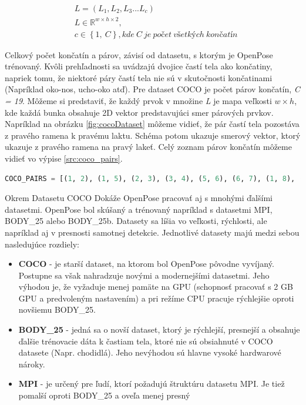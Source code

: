 \documentclass[slovak,master,dept460,male,cpp,cpdeclaration]{diploma}
\begin{document}
\begin{eqnarray}
& L = (L_{1}, L_{2}, L_{3} ... L_{c}) \label{eq:pafmap}\\
& L\in\mathbb{R}^{w \times  h \times 2},\nonumber\\
& c\in \left \{1,\: C  \right \}, kde\: C\: je\: počet\: všetkých\: končatín\nonumber
\end{eqnarray}

Celkový počet končatín a párov, závisí od datasetu, s ktorým je OpenPose trénovaný. Kvôli prehľadnosti sa uvádzajú dvojice častí tela ako končatiny, napriek tomu, že niektoré páry častí tela nie sú v skutočnosti končatinami (Napríklad oko-nos, ucho-oko atď). Pre dataset COCO je počet párov končatín, \textit{C = 19}. Môžeme si predstaviť, že každý prvok v množine \textit{L} je mapa veľkosti \textit{$w\times h$}, kde každá bunka obsahuje 2D vektor predstavujúci smer párových prvkov. Napríklad na obrázku \ref{fig:cocoDataset} môžeme vidieť, že pár častí tela pozostáva z pravého ramena k pravému laktu. Schéma potom ukazuje smerový vektor, ktorý ukazuje z pravého ramena na pravý lakeť. Celý zoznam párov končatín môžeme vidieť vo výpise \ref{src:coco_pairs}.\bigskip

\begin{lstlisting}[language=Python,label=src:coco_pairs,caption={Množina párov končatín v datasete COCO}]
COCO_PAIRS = [(1, 2), (1, 5), (2, 3), (3, 4), (5, 6), (6, 7), (1, 8), (8, 9), (9, 10), (1, 11), (11, 12), (12, 13), (1, 0), (0, 14), (14, 16), (0, 15), (15, 17), (2, 16), (5, 17)]
\end{lstlisting}

\bigskip
Okrem Datasetu COCO Dokáže OpenPose pracovať aj s mnohými ďalšími datasetmi. OpenPose bol skúšaný a trénovaný napríklad s datasetmi MPI, BODY\_25 alebo BODY\_25b. Datasety sa líšia vo veľkosti, rýchlosti, ale napríklad  aj v presnosti samotnej detekcie. Jednotlivé datasety majú medzi sebou nasledujúce rozdiely:


\begin{itemize}
\item \textbf{COCO} - je starší dataset, na ktorom bol OpenPose pôvodne vyvíjaný. Postupne sa však nahradzuje novými a modernejšími datasetmi. Jeho výhodou je, že vyžaduje menej pamäte na GPU (schopnosť pracovať s 2 GB GPU a predvoleným nastavením) a pri režíme CPU pracuje rýchlejšie oproti novšiemu BODY\_25.

\item \textbf{BODY\_25} - jedná sa o novší dataset, ktorý je rýchlejší, presnejší a obsahuje ďalšie trénovacie dáta k častiam tela, ktoré nie sú obsiahnuté v COCO datasete (Napr. chodidlá). Jeho nevýhodou sú hlavne vysoké hardwarové nároky.

\item \textbf{MPI} - je určený pre ľudí, ktorí požadujú štruktúru datasetu MPI. Je tiež pomalší oproti BODY\_25 a oveľa menej presný
\end{itemize}
\end{document}
